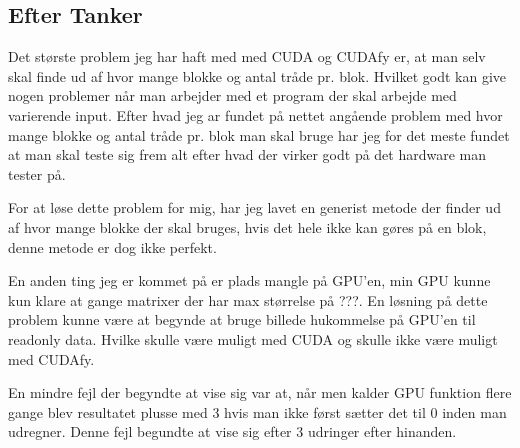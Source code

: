 \subsection{Efter Tanker}
Det største problem jeg har haft med med CUDA og CUDAfy er, at man selv skal finde ud af hvor mange blokke og antal tråde pr. blok. Hvilket godt kan give nogen problemer når man arbejder med et program der skal arbejde med varierende input. Efter hvad jeg ar fundet på nettet angående problem med hvor mange blokke og antal tråde pr. blok man skal bruge har jeg for det meste fundet at man skal teste sig frem alt efter hvad der virker godt på det hardware man tester på.

For at løse dette problem for mig, har jeg lavet en generist metode der finder ud af hvor mange blokke der skal bruges, hvis det hele ikke kan gøres på en blok, denne metode er dog ikke perfekt.

En anden ting jeg er kommet på er plads mangle på GPU'en, min GPU kunne kun klare at gange matrixer der har max størrelse på ???. En løsning på dette problem kunne være at begynde at bruge billede hukommelse på GPU'en til readonly data. Hvilke skulle være muligt med CUDA og skulle ikke være muligt med CUDAfy.

En mindre fejl der begyndte at vise sig var at, når men kalder GPU funktion flere gange blev resultatet plusse med 3 hvis man ikke først sætter det til 0 inden man udregner. Denne fejl begundte at vise sig efter 3 udringer efter hinanden.